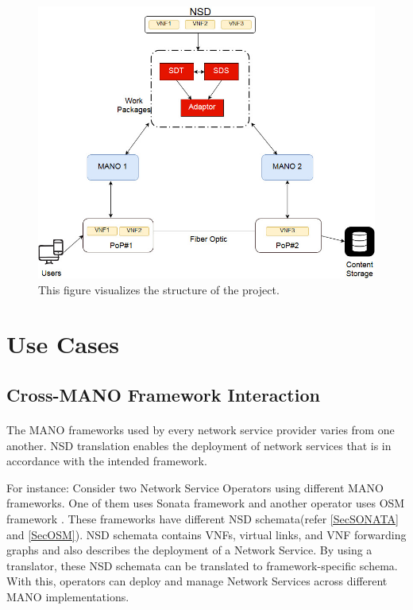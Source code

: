 \paragraph{}


\begin{figure}
	\centering
	\includegraphics[width=0.7\linewidth]{figures/Structure_Updated1}
	\caption{This figure visualizes the structure of the project. }
	\label{fig:structureupdated1}
\end{figure}


\newpage
\section{Use Cases}

\subsection{Cross-MANO Framework Interaction}
\paragraph{}

The MANO frameworks used by every network service provider varies from one another. NSD translation enables the deployment of network services that is in accordance with the intended framework.

For instance: Consider two Network Service Operators using different MANO frameworks. One of them uses Sonata framework \cite{draxler2017sonata} and another operator uses OSM framework \cite{ersue2013etsi}. These frameworks have different NSD schemata(refer \ref{SecSONATA} and \ref{SecOSM}). NSD schemata contains VNFs, virtual links, and VNF forwarding graphs and also describes the deployment of a Network Service. By using a translator, these NSD schemata can be translated to framework-specific schema. With this, operators can deploy and manage Network Services across different MANO implementations.

